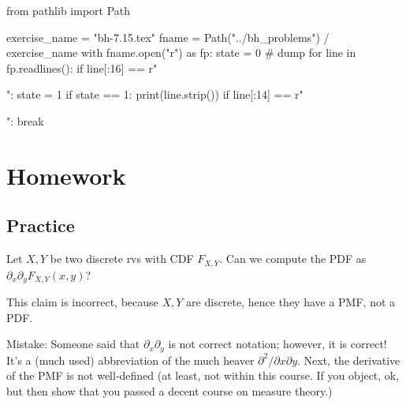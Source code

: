 \begin{pycode}
from pathlib import Path

exercise_name = "bh-7.15.tex"
fname = Path("../bh_problems") / exercise_name
with fname.open("r") as fp:
    state = 0  # dump
    for line in fp.readlines():
        if line[:16] == r"\begin{exercise}":
            state = 1
        if state == 1:
            print(line.strip())
        if line[:14] == r"\end{exercise}":
            break
\end{pycode}


\section{Homework}
\label{sec:homework}

\subsection{Practice}
\label{sec:practice}



\begin{exercise}
Let $X, Y$ be two discrete rvs with CDF $F_{X,Y}$.  Can we compute the PDF as $\partial_{x}\partial_{y} F_{X,Y}(x,y)$?
\begin{solution}
This claim is incorrect, because $X, Y$ are discrete, hence they have a PMF, not a PDF.

Mistake: Someone said that $\partial_{x}\partial_{y}$ is not correct notation; however, it is correct! It's a (much used) abbreviation of the much heaver $\partial^{2}/\partial x \partial y$. Next, the derivative of the PMF is not well-defined (at least, not within this course. If you object, ok, but then show that you passed a decent course on measure theory.)
\end{solution}
\end{exercise}



